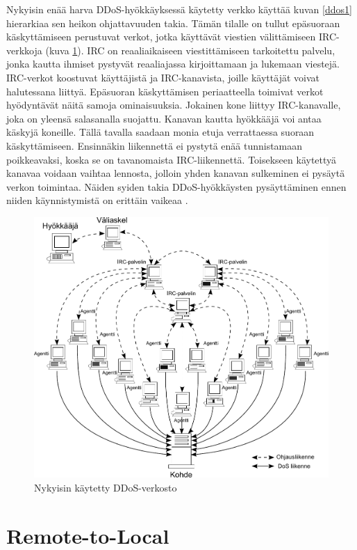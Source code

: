 Nykyisin enää harva DDoS-hyökkäyksessä käytetty verkko käyttää kuvan
\ref{ddos1} hierarkiaa sen heikon ohjattavuuden takia. Tämän tilalle
on tullut epäsuoraan käskyttämiseen perustuvat verkot, jotka käyttävät
viestien välittämiseen IRC-verkkoja (kuva \ref{ddos2}). IRC on
reaaliaikaiseen viestittämiseen tarkoitettu palvelu, jonka kautta
ihmiset pystyvät reaaliajassa kirjoittamaan ja lukemaan
viestejä. IRC-verkot koostuvat käyttäjistä ja IRC-kanavista, joille
käyttäjät voivat halutessana liittyä. Epäsuoran käskyttämisen
periaatteella toimivat verkot hyödyntävät näitä samoja
ominaisuuksia. Jokainen kone liittyy IRC-kanavalle, joka on yleensä
salasanalla suojattu. Kanavan kautta hyökkääjä voi antaa käskyjä
koneille. Tällä tavalla saadaan monia etuja verrattaessa suoraan
käskyttämiseen.  Ensinnäkin liikennettä ei pystytä enää tunnistamaan
poikkeavaksi, koska se on tavanomaista IRC-liikennettä. Toisekseen
käytettyä kanavaa voidaan vaihtaa lennosta, jolloin yhden kanavan
sulkeminen ei pysäytä verkon toimintaa. Näiden syiden takia
DDoS-hyökkäysten pysäyttäminen ennen niiden käynnistymistä on erittäin
vaikeaa \cite{DDOS}.

\begin{figure}[t]
\centering
\includegraphics[width=12cm]{pics/ddos_uusi.pdf}
\caption{Nykyisin käytetty DDoS-verkosto}
\label{ddos2}
\end{figure}

\section{Remote-to-Local}


